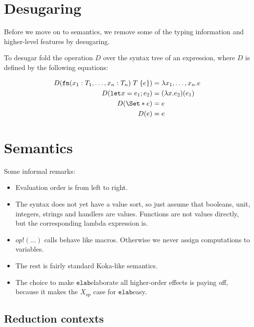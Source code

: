 \documentclass{article}
\newcommand\kw[1]{\ensuremath{\mathbf{\mathtt{#1}}}}
\newcommand\fn{\kw{fn}}
\newcommand\elab{\kw{elab}}
\renewcommand\S{\Set*}
\begin{document}
\section{Desugaring}

Before we move on to semantics, we remove some of the typing information and higher-level features by desugaring.

To desugar fold the operation $D$ over the syntax tree of an expression, where $D$ is defined by the following equations:

\begin{align*}
    D(\fn(x_1: T_1, \dots, x_n: T_n)\;T\;\{e\}) &= \lambda x_1,\dots,x_n . e \\
    D(\kw{let} x = e_1; e_2) &= (\lambda x . e_2)(e_1)\\
    D(\S{e}) &= e\\
    D(e) &= e
\end{align*}

\section{Semantics}


Some informal remarks:

\begin{itemize}
    \item Evaluation order is from left to right.
    \item The syntax does not yet have a value sort, so just assume that booleans, unit, integers, strings and handlers are values. Functions are not values directly, but the corresponding lambda expression is.
    \item $op!(\dots)$ calls behave like macros. Otherwise we never assign computations to variables.
    \item The rest is fairly standard Koka-like semantics.
    \item The choice to make $\elab$elaborate all higher-order effects is paying off, because it makes the $X_{op}$ case for $\elab$easy.
\end{itemize}

\subsection{Reduction contexts}
\end{document}
